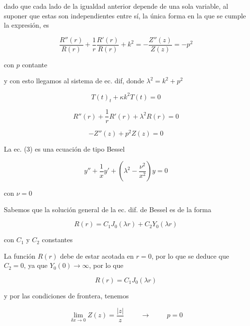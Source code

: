 \documentclass[12pt,a4paper]{article}
\begin{document}
\begin{enumerate}
    dado que cada lado de la igualdad anterior depende de una sola variable, al suponer que estas son independientes entre sí, la única forma en la que se cumple la expresión, es 
    
    \begin{equation*}
        \frac{R''(r)}{R(r)} + \frac{1}{r} \frac{R'(r)}{R(r)}+ k^2=-\frac{Z''(z)}{Z(z)} =-p^2
    \end{equation*}
    
    
    con $p$ contante
   
    y con esto llegamos al sistema de ec. dif, donde $\lambda^2 = k^2+p^2 $
    
    \begin{equation}
        T(t)_t+\kappa k^2T(t)=0
    \end{equation}
    
    \begin{equation}
        R''(r)+ \frac{1}{r} R'(r)+\lambda^2 R(r)=0
    \end{equation}
    
    \begin{equation}
        -Z''(z)+p^2Z(z)=0
    \end{equation}
   
   
   La ec. (3) es una ecuación de tipo Bessel
   
   \begin{equation*}
       y'' + \frac{1}{x}y' + \left(\lambda^2 - \frac{\nu^2}{x^2}\right) y = 0
   \end{equation*}
   
   con $\nu = 0$
   
   Sabemos que la solución general de la ec. dif. de Bessel es de la forma 
   
   \begin{equation*}
       R(r)=C_1J_0(\lambda r)+C_2Y_0(\lambda r)
   \end{equation*}
   
   con $C_1$ y $C_2$ constantes
   
   La función $R(r)$ debe de estar acotada en $r=0$, por lo que se deduce que $C_2 = 0$, ya que $Y_0 (0) \rightarrow \infty$, por lo que
   
   \begin{equation*}
       R(r)=C_1J_0(\lambda r)
   \end{equation*}
   
   y por las condiciones de frontera, tenemos
   
   \begin{equation*}
       \lim_{\delta x \rightarrow 0} Z(z)=\frac{|z|}{z} \hspace{1cm}  \rightarrow \hspace{1cm} p=0
   \end{equation*}
   

\end{enumerate}
\end{document}
